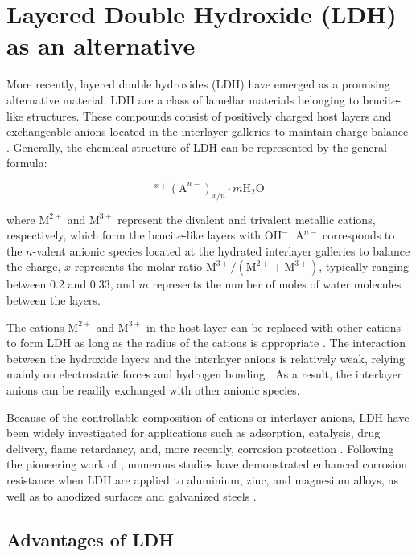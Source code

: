\documentclass[11pt,twoside,a4paper]{report}
\begin{document}
\section{Layered Double Hydroxide (LDH) as an alternative}
More recently, layered double hydroxides (LDH) have emerged as a promising alternative material. LDH are a class of lamellar materials belonging to brucite-like structures. These compounds consist of positively charged host layers and exchangeable anions located in the interlayer galleries to maintain charge balance \cite{Bouali2020,Zhou2017,He2020,Iuzviuk2020,Cao2022}. Generally, the chemical structure of LDH can be represented by the general formula:

\begin{equation}
[\mathrm{M}^{2+}_{1-x}\mathrm{M}^{3+}_{x}(\mathrm{OH})_{2}]^{x+}(\mathrm{A}^{n-})_{x/n} \cdot m\mathrm{H}_{2}\mathrm{O}
\label{eq1}
\end{equation}

where $\text{M}^{2+}$ and $\text{M}^{3+}$ represent the divalent and trivalent metallic cations, respectively, which form the brucite-like layers with $\text{OH}^{-}$. $\text{A}^{n-}$ corresponds to the $n$-valent anionic species located at the hydrated interlayer galleries to balance the charge, $x$ represents the molar ratio $\text{M}^{3+}/(\text{M}^{2+} + \text{M}^{3+})$, typically ranging between 0.2 and 0.33, and $m$ represents the number of moles of water 
molecules between the layers\cite{He2020,Cao2022}.

The cations $\text{M}^{2+}$ and $\text{M}^{3+}$ in the host layer can be replaced with other cations to form LDH as long as the radius of the cations is appropriate \cite{He2020}. The interaction between the hydroxide layers and the interlayer anions is relatively weak, relying mainly on electrostatic forces and hydrogen bonding \cite{He2020}. As a result, the interlayer anions can be readily exchanged with other anionic species. 

Because of the controllable composition of cations or interlayer anions, LDH have been widely investigated for applications such as adsorption, catalysis, drug delivery, flame retardancy, and, more recently, corrosion protection \cite{He2020}. Following the pioneering work of \citet{Buchheit2003}, numerous studies have demonstrated enhanced corrosion resistance when LDH are applied to aluminium, zinc, and magnesium alloys, as well as to anodized surfaces and galvanized steels \cite{Iuzviuk2020}.

\subsection{Advantages of LDH}
\end{document}
